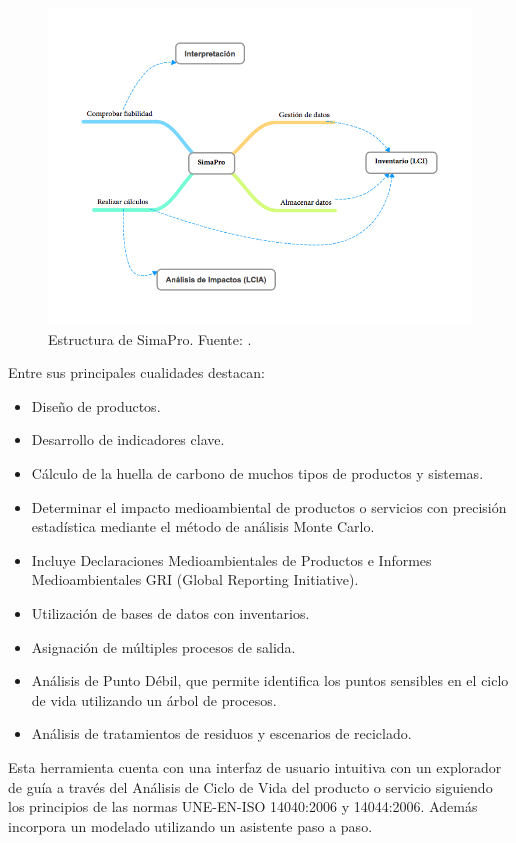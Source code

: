 \begin{figure}[!htb]
\centering
\includegraphics[width=13cm]{img/simapro.png}
\caption[Estructura de SimaPro.]{Estructura de SimaPro. Fuente: \protect\cite{mgoedkoop2}.}
\label{fig:simapro}
\end{figure}

Entre sus principales cualidades destacan:

\begin{itemize}
  \item Diseño de productos.
  \item Desarrollo de indicadores clave.
  \item Cálculo de la huella de carbono de muchos tipos de productos y sistemas.
  \item Determinar el impacto medioambiental de productos o servicios con precisión estadística mediante el método de análisis Monte Carlo.
  \item Incluye Declaraciones Medioambientales de Productos e Informes Medioambientales GRI (Global Reporting Initiative).
  \item Utilización de bases de datos con inventarios.
  \item Asignación de múltiples procesos de salida.
  \item Análisis de Punto Débil, que permite identifica los puntos sensibles en el ciclo de vida utilizando un árbol de procesos.
  \item Análisis de tratamientos de residuos y escenarios de reciclado.
\end{itemize}

Esta herramienta cuenta con una interfaz de usuario intuitiva con un explorador de guía a través del Análisis de Ciclo de Vida del producto o servicio siguiendo los principios de las normas UNE-EN-ISO 14040:2006 y 14044:2006. Además incorpora un modelado utilizando un asistente paso a paso.

